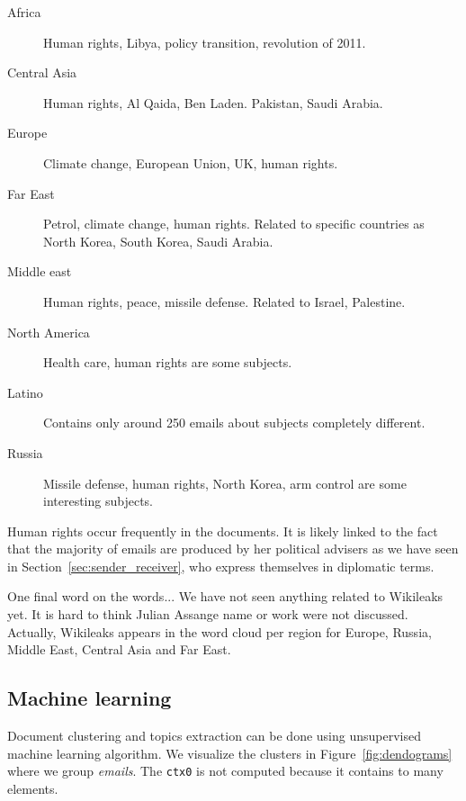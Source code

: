 \documentclass[11pt]{article}
\begin{document}
\begin{description}
	\item[Africa] Human rights, Libya, policy transition, revolution of 2011.
	\item[Central Asia] Human rights, Al Qaida, Ben Laden. Pakistan, Saudi Arabia.
	\item[Europe] Climate change, European Union, UK, human rights.
	\item[Far East] Petrol, climate change, human rights. Related to specific countries as North Korea, South Korea, Saudi Arabia.
	\item[Middle east] Human rights, peace, missile defense. Related to Israel, Palestine.
	\item[North America] Health care, human rights are some subjects.
	\item[Latino] Contains only around 250 emails about subjects completely different.
	\item[Russia] Missile defense, human rights, North Korea, arm control are some interesting subjects.
\end{description}

Human rights occur frequently in the documents. It is likely linked to the fact that the majority of emails are produced by her political advisers as we have seen in Section~\ref{sec:sender_receiver}, who express themselves in diplomatic terms.

One final word on the words... We have not seen anything related to Wikileaks yet. It is hard to think Julian Assange name or work were not discussed. Actually, Wikileaks appears in the word cloud per region for Europe, Russia, Middle East, Central Asia and Far East.

\subsection{Machine learning}

Document clustering and topics extraction can be done using unsupervised machine learning algorithm. We visualize the clusters in Figure~\ref{fig:dendograms} where we group \emph{emails}. The \texttt{ctx0} is not computed because it contains to many elements.
\end{document}
